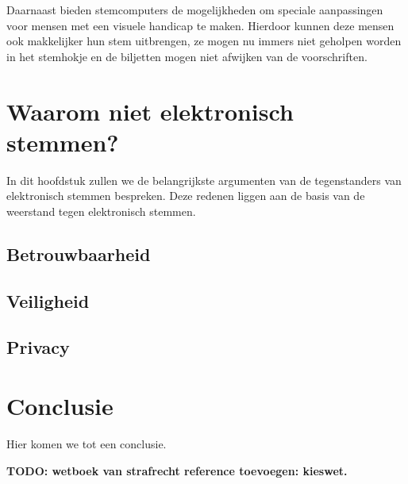 \documentclass[a4paper]{article}
\newcommand{\TODO}[1]{{\color{red}\textbf{TODO: #1}}}
\begin{document}
Daarnaast bieden stemcomputers de mogelijkheden om speciale aanpassingen voor mensen met een visuele handicap te maken.
Hierdoor kunnen deze mensen ook makkelijker hun stem uitbrengen, ze mogen nu immers niet geholpen worden in het stemhokje en de biljetten mogen niet afwijken van de voorschriften.

\newpage

\section{Waarom niet elektronisch stemmen?}
In dit hoofdstuk zullen we de belangrijkste argumenten van de tegenstanders van elektronisch stemmen bespreken.
Deze redenen liggen aan de basis van de weerstand tegen elektronisch stemmen.

\subsection{Betrouwbaarheid}

\subsection{Veiligheid}

\subsection{Privacy}

\newpage

\section{Conclusie}

Hier komen we tot een conclusie.

\TODO{wetboek van strafrecht reference toevoegen: kieswet.}


\renewcommand\refname{Literatuur}

\end{document}
